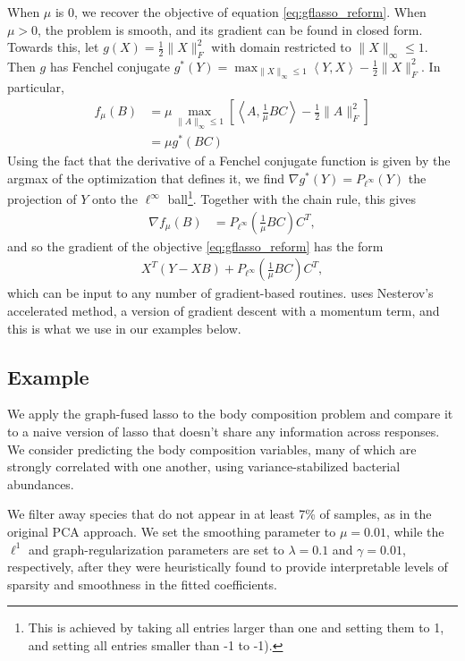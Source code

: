 \documentclass[14pt]{extarticle}
\begin{document}
When $\mu$ is 0, we recover the objective of equation \ref{eq:gflasso_reform}.
When $\mu > 0$, the problem is smooth, and its gradient can be found in closed
form. Towards this, let $g\left(X\right) = \frac{1}{2}\|X\|_{F}^{2}$ with domain
restricted to $\|X\|_{\infty} \leq 1$. Then $g$ has Fenchel conjugate
$g^{\ast}\left(Y\right) = \max_{\|X\|_{\infty}\leq 1}\left<Y, X\right> -
\frac{1}{2}\|X\|_{F}^{2}$. In particular,
\begin{align*}
f_{\mu}\left(B\right) &=  \mu \max_{\|A\|_{\infty} \leq 1}
\left[\left<A, \frac{1}{\mu}BC\right> - \frac{1}{2}\|A\|_{F}^{2}\right] \\
&= \mu g^{\ast}\left(BC\right)
\end{align*}
Using the fact that the derivative of a Fenchel conjugate function is given by
the argmax of the optimization that defines it, we find $\nabla
g^{\ast}\left(Y\right) = P_{\ell^{\infty}}\left(Y\right)$ the projection of $Y$
onto the $\ell^{\infty}$ ball\footnote{This is achieved by taking all entries
  larger than one and setting them to 1, and setting all entries smaller than -1
  to -1).}. Together with the chain rule, this gives
\begin{align*}
  \nabla f_{\mu}\left(B\right) &= P_{\ell^{\infty}}\left(\frac{1}{\mu}BC\right)C^{T},
\end{align*}
and so the gradient of the objective \ref{eq:gflasso_reform} has the form
\begin{align*}
 X^{T}\left(Y - XB\right) + P_{\ell^{\infty}}\left(\frac{1}{\mu}BC\right)C^{T},
\end{align*}
which can be input to any number of gradient-based routines.
\cite{chen2010graph} uses Nesterov's accelerated method, a version of gradient
descent with a momentum term, and this is what we use in our examples below.

\subsection{Example}
\label{subsec:graph_fused_example}

We apply the graph-fused lasso to the body composition problem and compare it to
a naive version of lasso that doesn't share any information across responses. We
consider predicting the body composition variables, many of which are strongly
correlated with one another, using variance-stabilized bacterial abundances.

We filter away species that do not appear in at least 7\% of samples, as in the
original PCA approach. We set the smoothing parameter to $\mu = 0.01$, while the
$\ell^{1}$ and graph-regularization parameters are set to $\lambda = 0.1$ and
$\gamma = 0.01$, respectively, after they were heuristically found to provide
interpretable levels of sparsity and smoothness in the fitted coefficients.
\end{document}
